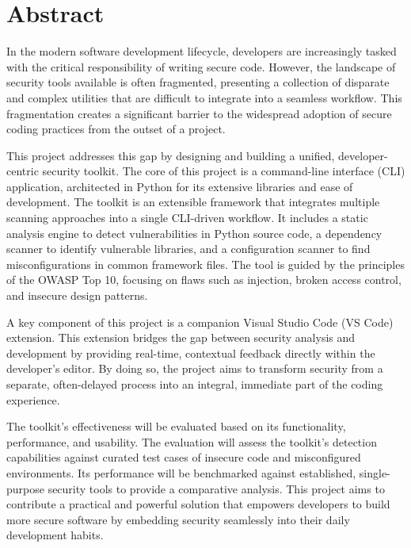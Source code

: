 %
%
\chapter{Abstract}
\begin{SingleSpace}
In the modern software development lifecycle, developers are increasingly tasked with the critical responsibility of writing secure code. However, the landscape of security tools available is often fragmented, presenting a collection of disparate and complex utilities that are difficult to integrate into a seamless workflow. This fragmentation creates a significant barrier to the widespread adoption of secure coding practices from the outset of a project.

This project addresses this gap by designing and building a unified, developer-centric security toolkit. The core of this project is a command-line interface (CLI) application, architected in Python for its extensive libraries and ease of development. The toolkit is an extensible framework that integrates multiple scanning approaches into a single CLI-driven workflow. It includes a static analysis engine to detect vulnerabilities in Python source code, a dependency scanner to identify vulnerable libraries, and a configuration scanner to find misconfigurations in common framework files. The tool is guided by the principles of the OWASP Top 10, focusing on flaws such as injection, broken access control, and insecure design patterns.

A key component of this project is a companion Visual Studio Code (VS Code) extension. This extension bridges the gap between security analysis and development by providing real-time, contextual feedback directly within the developer's editor. By doing so, the project aims to transform security from a separate, often-delayed process into an integral, immediate part of the coding experience.

The toolkit's effectiveness will be evaluated based on its functionality, performance, and usability. The evaluation will assess the toolkit's detection capabilities against curated test cases of insecure code and misconfigured environments. Its performance will be benchmarked against established, single-purpose security tools to provide a comparative analysis. This project aims to contribute a practical and powerful solution that empowers developers to build more secure software by embedding security seamlessly into their daily development habits.
\end{SingleSpace}
